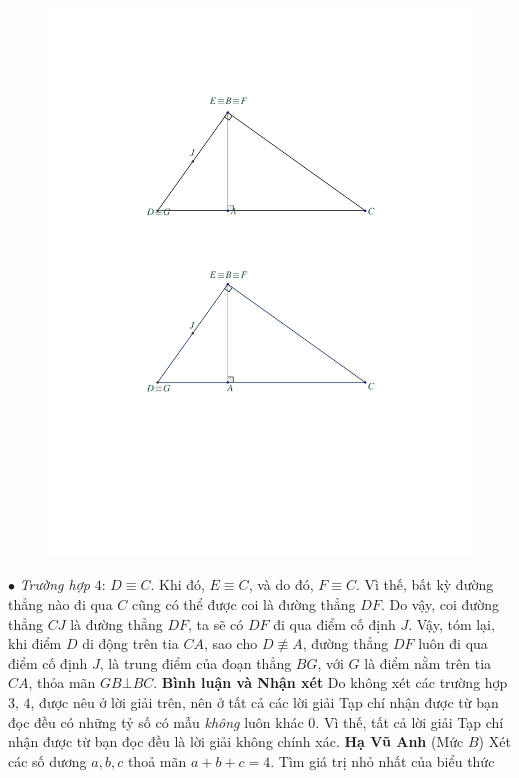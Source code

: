 \begin{multicols}{2}
\begin{figure}[H]
		\includegraphics[width=0.9\linewidth]{P615H2}
		\vspace*{-15pt}
	\end{figure}
	$\bullet$ \textit{Trường hợp} $4$: $D \equiv C$.
	\vskip 0.05cm
	Khi đó, $E \equiv C$, và do đó, $F \equiv C$. Vì thế, bất kỳ đường thẳng nào đi qua $C$ cũng có thể được coi là đường thẳng $DF$. Do vậy, coi đường thẳng $CJ$ là đường thẳng $DF$, ta sẽ có $DF$ đi qua điểm cố định $J$.
	\vskip 0.05cm
	Vậy, tóm lại, khi điểm $D$ di động trên tia $CA$, sao cho  $D \not\equiv A$, đường thẳng $DF$ luôn đi qua điểm cố định $J$, là trung điểm của đoạn thẳng $BG$, với $G$ là điểm nằm trên tia $CA$, thỏa mãn $GB \bot BC$.
	\vskip 0.05cm
	\textbf{\color{thachthuctoanhoc}Bình luận và Nhận xét}
	\vskip 0.05cm
	Do không xét các trường hợp $3$, $4$, được nêu ở lời giải trên, nên ở tất cả các lời giải Tạp chí nhận được từ bạn đọc đều có những tỷ số có mẫu \textit{không} luôn khác $0$. Vì thế, tất cả lời giải Tạp chí nhận được từ bạn đọc đều là lời giải không chính xác.
	\vskip 0.05cm
	\hfill	\textbf{\color{thachthuctoanhoc}Hạ Vũ Anh}
	\vskip 0.05cm
	{}
	(Mức $B$) Xét các số dương $a,b,c$ thoả mãn $a+b+c=4$. Tìm giá trị nhỏ nhất của biểu thức 

\end{multicols}
